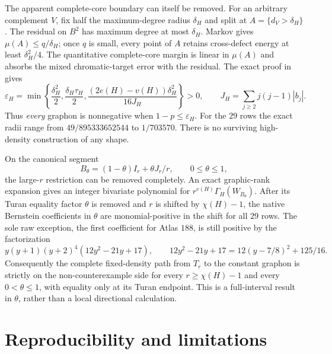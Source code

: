 \documentclass[11pt]{article}
\begin{document}
The apparent complete-core boundary can itself be removed.  For an arbitrary
complement $V$, fix half the maximum-degree radius $\delta_H$ and split at
$A=\{d_V>\delta_H\}$.  The residual on $B^2$ has maximum degree at most
$\delta_H$.  Markov gives $\mu(A)\leq q/\delta_H$; once $q$ is small, every
point of $A$ retains cross-defect energy at least $\delta_H^2/4$.  The
quantitative complete-core margin is linear in $\mu(A)$ and absorbs the mixed
chromatic-target error with the residual.  The exact proof in
 gives
\[
 \varepsilon_H=\min\left\{
 \frac{\delta_H^2}{2},\frac{\delta_H\tau_H}{2},
 \frac{(2e(H)-v(H))\delta_H^2}{16J_H}
 \right\}>0,
 \qquad
 J_H=\sum_{j\geq2}j(j-1)|b_j|.
\]
Thus \emph{every} graphon is nonnegative when $1-p\leq\varepsilon_H$.
For the $29$ rows the exact radii range from $49/895333652544$ to
$1/703570$.  There is no surviving high-density construction of any shape.

On the canonical segment
\[
 B_\theta=(1-\theta)I_r+\theta J_r/r,
 \qquad0\leq\theta\leq1,
\]
the large-$r$ restriction can be removed completely.  An exact
graphic-rank expansion gives an integer bivariate polynomial for
$r^{e(H)}\Gamma_H(W_{B_\theta})$.  After its Turan equality factor $\theta$
is removed and $r$ is shifted by $\chi(H)-1$, the native Bernstein
coefficients in $\theta$ are monomial-positive in the shift for all $29$
rows.  The sole raw exception, the first coefficient for Atlas $188$, is
still positive by the factorization
\[
 y(y+1)(y+2)^4(12y^2-21y+17),
 \qquad
 12y^2-21y+17=12(y-7/8)^2+125/16.
\]
Consequently the complete fixed-density path from $T_r$ to the constant
graphon is strictly on the non-counterexample side for every
$r\geq\chi(H)-1$ and every $0<\theta\leq1$, with equality only at its Turan
endpoint.  This is a full-interval result in $\theta$, rather than a local
directional calculation.


\section{Reproducibility and limitations}
\end{document}
